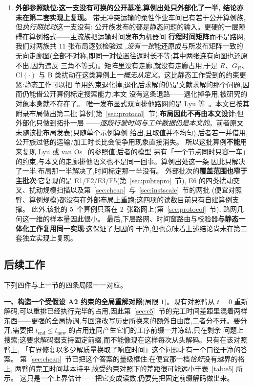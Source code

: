 \documentclass[manuscript,screen,review]{acmart}
\newcommand{\NPubInst}{5}
\newcommand{\NPubNets}{2}
\begin{document}
\begin{enumerate}[leftmargin=1.6em,itemsep=0.35em]
\item \textbf{外部参照缺位:这一支没有可换的公开基准,算例出处只外部化了一半,
结论亦未在第二套实现上复现。}
带无冲突运输的柔性作业车间已有若干公开算例族,但\emph{执行期扰动}这一支没有:
公开族发布的都是静态问题的输入。更硬的一层障碍在算例格式——主流族把运输时间发布为机器间
\textbf{行程时间矩阵}而不是路网,我们对两族共 \(11\) 张布局逐张检验过
\cite{homayouni2021production,bilge1995time},\emph{没有一张}能还原成与所发布矩阵一致的
无向走廊图(全部不对称,即同一对位置往返时长不等;其中两张连有向图也还原不出,因为违反
三角不等式)。矩阵里没有走廊,就没有走廊占用,于是 \(R\)、\(G_R\)、\(\mathrm{Cl}(\cdot)\)
与 B 类扰动在这类算例上\emph{一概无从定义}。这比静态工作受到的约束更紧:静态工作可以把
争用约束退化掉,退化后求解的仍是文献求解的那个问题,因而仍能借公开算例标定搜索能力;本文
没有这条退路——退化掉争用,被研究的对象本身就不存在了。
唯一发布显式双向排他路网的是 Lyu 等~\cite{lyu2019approach}。本文已按其附录布局做出第二批
算例(第~\ref{sec:protocol}~节),\textbf{布局因此不再由本文设计};但外部化只做到拓扑一层
——\emph{逐段行驶时间与工件数据仍是本文的}。前者原文未随该批布局发表(只随单个示例算例
给出,且取值并不均匀),后者若一并借用,公开族过低的运输/加工时长比会使争用现象直接消失。
所以这批算例\textbf{不能}用来复现 Lyu 或 van Os~\cite{vanos2026exact} 的参照值;后者的模型
另有「一个节点同时只容一车」的约束,与本文的走廊排他语义也不是同一回事。算例出处这一条
因此只解决了一半:布局那一半解决了,时间标定那一半没有。
外部批次的\textbf{覆盖范围也窄于主批次}:它复现的是 E1/E2/E3/E5(第~\ref{sec:pubrepro}~节),
E6 的四类扰动交叉、扰动规模扫描以及第~\ref{sec:cheap}~与~\ref{sec:instscale}~节的两批
(便宜对照臂、算例规模)都没有在外部布局上重跑;这四项的读数目前只有自建算例支撑。
此外,该批的 \NPubInst\ 个算例只落在 \NPubNets\ 张路网上(第~\ref{sec:protocol}~节),
路网几何这一维的样本量因此很小。
最后,下层路网、时间窗路由与校验器\textbf{与静态一体化工作复用同一实现}:这保证了归因的
干净,但也意味着上述结论尚未在第二套独立实现上复现。
\end{enumerate}

\subsection{后续工作}
\label{sec:future}

下列四件与上一节的四条局限一一对应。

\textbf{一、构造一个受假设 A2 约束的全局重解对照}(局限 \(1\))。现有对照臂从 \(t=0\)
重新解码,可以重排已经执行完毕的占用,因此第~\ref{sec:e5}~节的完工时间差距里混着两样
东西——更强的全局协调,与回溯改写历史所换来的额外自由度,二者分不开。要分开,需要把
\(t_{\mathrm{end}}\le t_{\mathrm{now}}\) 的占用连同产生它们的工序前缀一并冻结,只在剩余
问题上搜索;这要求解码器支持固定前缀,而不能像现在这样每次从头解码。只有在该对照臂上,
「有界修复以多少解质量换取了响应时间」这个问题才有一个口径干净的答案。
第~\ref{sec:cheap}~节已把这个答案的量级框住:在便宜那一档\emph{恰好}没有越界的格上,
两臂的完工时间基本持平,故受约束对照下的差距很可能远小于表~\ref{tab:e5} 所示。
这只是一个上界估计——把它变成读数,仍要先把固定前缀解码做出来。
\end{document}
